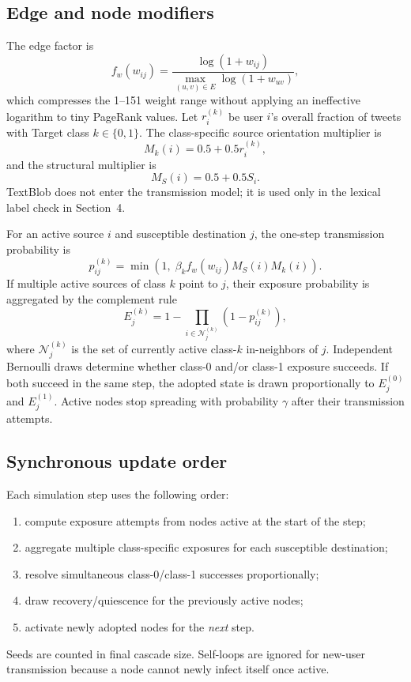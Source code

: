 \documentclass[11pt,a4paper]{article}
\begin{document}
\subsection{Edge and node modifiers}
The edge factor is
\begin{equation}
f_w(w_{ij})=\frac{\log(1+w_{ij})}{\max_{(u,v)\in E}\log(1+w_{uv})},
\end{equation}
which compresses the 1--151 weight range without applying an ineffective logarithm to tiny PageRank values. Let $r_i^{(k)}$ be user $i$'s overall fraction of tweets with Target class $k\in\{0,1\}$. The class-specific source orientation multiplier is
\begin{equation}
M_k(i)=0.5+0.5r_i^{(k)},
\end{equation}
and the structural multiplier is
\begin{equation}
M_S(i)=0.5+0.5S_i.
\end{equation}
TextBlob does not enter the transmission model; it is used only in the lexical label check in Section~4.

For an active source $i$ and susceptible destination $j$, the one-step transmission probability is
\begin{equation}
p_{ij}^{(k)}=\min\left(1,\;\beta_k f_w(w_{ij})M_S(i)M_k(i)\right).
\label{eq:trans}
\end{equation}
If multiple active sources of class $k$ point to $j$, their exposure probability is aggregated by the complement rule
\begin{equation}
E_j^{(k)}=1-\prod_{i\in\mathcal{N}^{(k)}_j}\left(1-p_{ij}^{(k)}\right),
\end{equation}
where $\mathcal{N}^{(k)}_j$ is the set of currently active class-$k$ in-neighbors of $j$. Independent Bernoulli draws determine whether class-0 and/or class-1 exposure succeeds. If both succeed in the same step, the adopted state is drawn proportionally to $E_j^{(0)}$ and $E_j^{(1)}$. Active nodes stop spreading with probability $\gamma$ after their transmission attempts.

\subsection{Synchronous update order}
Each simulation step uses the following order:
\begin{enumerate}[leftmargin=8mm]
\item compute exposure attempts from nodes active at the start of the step;
\item aggregate multiple class-specific exposures for each susceptible destination;
\item resolve simultaneous class-0/class-1 successes proportionally;
\item draw recovery/quiescence for the previously active nodes;
\item activate newly adopted nodes for the \emph{next} step.
\end{enumerate}
Seeds are counted in final cascade size. Self-loops are ignored for new-user transmission because a node cannot newly infect itself once active.
\end{document}
